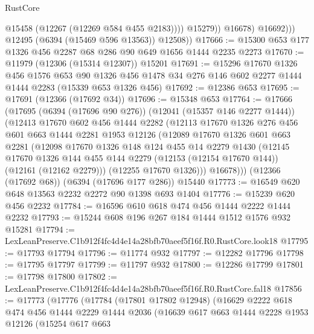 \begin{lexlean}{RustCore}
\begin{coremodule}
                        @15458
                        (@12267 (@12269 @584 @455 @2183))))
                    @15279))
                @16678)
              @16692)))
        @12495
        (@6394 (@15469 @596 @13563))
        @12508))
@17666 := @15300 @653 @177 @1326 @456 @2287 @68 @286 @90 @649 @1656 @1444 @2235 @2273
@17670 := @11979 (@12306 (@15314 @12307)) @15201
@17691 := @15296
    @17670
    @1326
    @456
    @1576
    @653
    @90
    @1326
    @456
    @1478
    @34
    @276
    @146
    @602
    @2277
    @1444
    @1444
    @2283
    (@15339 @653 @1326 @456)
@17692 := @12386 @653
@17695 := @17691 (@12366 (@17692 @34))
@17696 := @15348 @653
@17764 := @17666
    (@17695
      (@6394 (@17696 @90 @276))
      (@12041 (@15357 @146 @2277 @1444))
      (@12413
        @17670
        @602
        @456
        @1444
        @2282
        (@12113
          @17670
          @1326
          @276
          @456
          @601
          @663
          @1444
          @2281
          @1953
          @12126
          (@12089
            @17670
            @1326
            @601
            @663
            @2281
            (@12098
              @17670
              @1326
              @148
              @124
              @455
              @14
              @2279
              @1430
              (@12145
                @17670
                @1326
                @144
                @455
                @144
                @2279
                (@12153 (@12154 @17670 @144))
                (@12161 (@12162 @2279)))
              (@12255 @17670 @1326)))
          @16678)))
    (@12366 (@17692 @68))
    (@6394 (@17696 @177 @286))
    @15440
@17773 := @16549 @620 @648 @13563 @2232 @2272 @90 @1398 @693 @1404
@17776 := @15239 @620 @456 @2232
@17784 := @16596 @610 @618 @474 @456 @1444 @2222 @1444 @2232
@17793 := @15244 @608 @196 @267 @184 @1444 @1512 @1576 @932 @15281
@17794 := LexLeanPreserve.C1b912f4fc4d4e14a28bfb70aeef5f16f.R0.RustCore.look18
@17795 := @17793 @17794
@17796 := @11774 @932
@17797 := @12282 @17796
@17798 := @17795 @17797
@17799 := @11797 @932
@17800 := @12286 @17799
@17801 := @17798 @17800
@17802 := LexLeanPreserve.C1b912f4fc4d4e14a28bfb70aeef5f16f.R0.RustCore.fal18
@17856 := @17773
    (@17776
      (@17784
        (@17801 @17802 @12948)
        (@16629
          @2222
          @618
          @474
          @456
          @1444
          @2229
          @1444
          @2036
          (@16639
            @617
            @663
            @1444
            @2228
            @1953
            @12126
            (@15254
              @617
              @663

\end{coremodule}
\end{lexlean}
